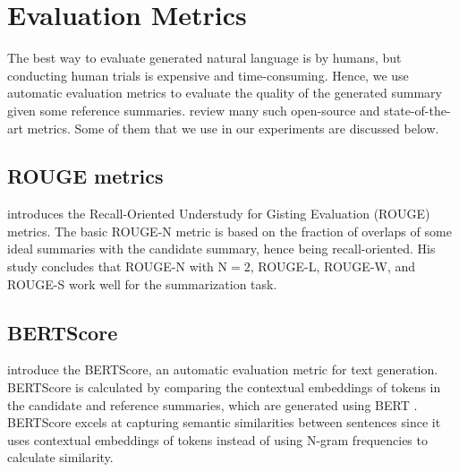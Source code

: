 \section{Evaluation Metrics}
\label{sec:metrics}

The best way to evaluate generated natural language is by humans, but conducting
human trials is expensive and time-consuming.
Hence, we use automatic evaluation metrics to evaluate the quality of the generated
summary given some reference summaries.
\citet{fabbri2021summeval} review many such open-source and state-of-the-art metrics.
Some of them that we use in our experiments are discussed below.


\subsection{ROUGE metrics}

\citet{lin-2004-rouge} introduces the Recall-Oriented Understudy for Gisting
Evaluation (ROUGE) metrics.
The basic ROUGE-N metric is based on the fraction of overlaps of some ideal summaries
with the candidate summary, hence being recall-oriented.
His study concludes that ROUGE-N with $\text{N}=2$, ROUGE-L, ROUGE-W, and ROUGE-S work
well for the summarization task.


\subsection{BERTScore}

\citet{zhang2019bertscore} introduce the BERTScore, an automatic evaluation metric for
text generation.
BERTScore is calculated by comparing the contextual embeddings of tokens in the candidate
and reference summaries, which are generated using BERT \cite{devlin2018bert}.
BERTScore excels at capturing semantic similarities between sentences since it uses
contextual embeddings of tokens instead of using N-gram frequencies to calculate similarity.






